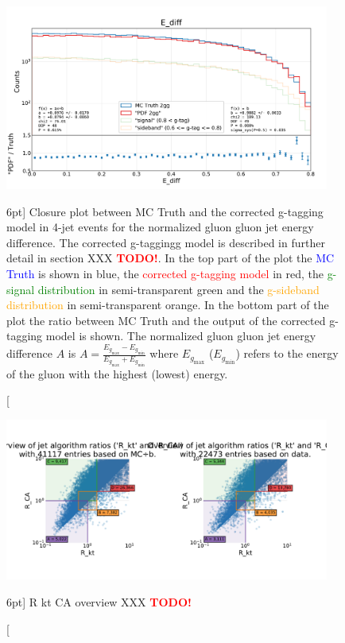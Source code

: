 \documentclass[a4paper, twoside]{tufte-book}
\newcommand{\code}[1]{\colorbox{light-gray}{\texttt{\detokenize{#1}}}}
\newcommand{\TODO}{\textcolor{red}{\bf TODO!}\xspace}
\begin{document}
\begin{figure}
  \includegraphics[width=0.95\textwidth, trim=0 0 0 65, clip, page=1]{figures/quarks/gtag-closure_test-down_sample=1.00-ML_vars=vertex-selection=b-ejet_min=4-n_iter_RS_lgb=99-n_iter_RS_xgb=9-cdot_cut=0.90-version=19-njet=3.pdf}
  \caption[Closure plot between MC Truth and the corrected g-tagging model in 4-jet events for the normalized gluon gluon jet energy difference][6pt]
          {Closure plot between MC Truth and the corrected g-tagging model in 4-jet events for the normalized gluon gluon jet energy difference. The corrected g-taggingg model is described in further detail in section XXX \TODO. In the top part of the plot the \textcolor{blue}{MC Truth} is shown in blue, the \textcolor{red}{corrected g-tagging model} \code{"PDF 2gg"} in red, the \textcolor{green}{g-signal distribution} in semi-transparent green and the \textcolor{orange}{g-sideband distribution} in semi-transparent orange. In the bottom part of the plot the ratio between MC Truth and the output of the corrected g-tagging model is shown. The normalized gluon gluon jet energy difference $A$ is $A=\frac{E_{g_\mathrm{max}}-E_{g_\mathrm{min}}}{E_{g_\mathrm{max}}+E_{g_\mathrm{min}}}$ where $E_{g_\mathrm{max}}$ ($E_{g_\mathrm{min}}$) refers to the energy of the gluon with the highest (lowest) energy.
          } 
  \label{fig:q:closure_E_diff}
\end{figure}


\begin{figure}
  \includegraphics[width=0.95\textwidth, trim=0 0 0 118, clip, page=1]{figures/quarks/gtag-R_kt_CA_overview-down_sample=1.00-ML_vars=vertex-selection=b-ejet_min=4-n_iter_RS_lgb=99-n_iter_RS_xgb=9-cdot_cut=0.90-version=19-njet=4}
  \caption[R kt CA overview  XXX \TODO][6pt]
          {R kt CA overview XXX \TODO
          } 
  \label{fig:q:R_kt_CA_overview}
\end{figure}
\end{document}
